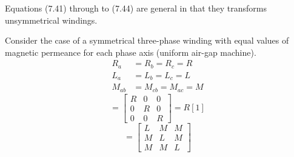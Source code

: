 \documentclass[a4paper,numbers=noenddot,12pt]{scrbook}
\begin{document}
        Equations (7.41) through to (7.44) are general in that they transforms unsymmetrical windings.

        Consider the case of a symmetrical three-phase winding with equal values of magnetic permeance for each phase axis (uniform air-gap machine).
        \begin{equation}
            \begin{aligned}
                R_a & = R_b = R_c = R \\
                L_a & = L_b = L_c = L \\
                M_{ab} & = M_{cb} = M_{ac} = M
            \end{aligned}
        \end{equation}
        \begin{equation}
            [R_{abc}] = 
            \begin{bmatrix}
                R & 0 & 0 \\
                0 & R & 0 \\
                0 & 0 & R
            \end{bmatrix}
            = R[1]
            \label{eq:Eq7.46}
        \end{equation}
        \begin{equation}
            [L_{abc}] = 
            \begin{bmatrix}
                L & M & M \\
                M & L & M \\
                M & M & L
            \end{bmatrix}
            \label{eq:Eq7.47}
        \end{equation}
\end{document}
